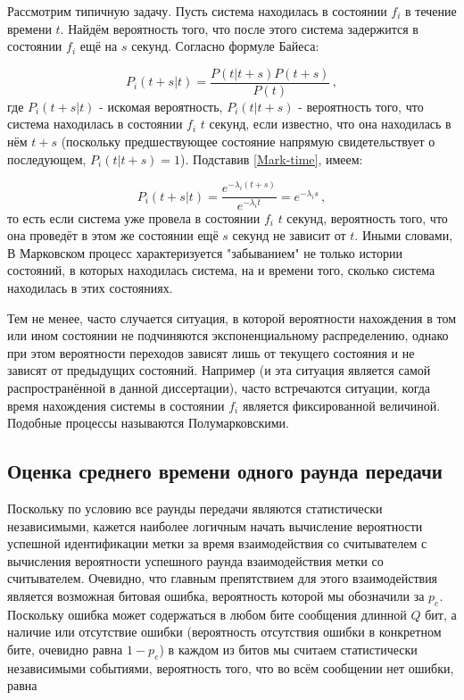 \documentclass[12pt]{article}
\theoremstyle{definition}
\begin{document}
Рассмотрим типичную задачу. Пусть система находилась в состоянии $f_i$ в течение времени $t$. Найдём вероятность того, что после этого система задержится в состоянии $f_i$ ещё на $s$ секунд. Согласно формуле Байеса:

\begin{equation}
    P_i(t+s|t) = \frac{P(t|t+s)P(t+s)}{P(t)}\,,
\end{equation}
где $P_i(t+s|t)$ - искомая вероятность, $P_i(t|t+s)$ - вероятность того, что система находилась в состоянии $f_i$ $t$ секунд, если известно, что она находилась в нём $t+s$ (поскольку предшествующее состояние напрямую свидетельствует о последующем, $P_i(t|t+s) = 1$). Подставив \eqref{Mark-time}, имеем:

\begin{equation}
    P_i(t+s|t) = \frac{e^{-\lambda_i(t+s)}}{e^{-\lambda_it}} = e^{-\lambda_is}\,,
\end{equation}
то есть если система уже провела в состоянии $f_i$ $t$ секунд, вероятность того, что она проведёт в этом же состоянии ещё $s$ секунд не зависит от $t$. Иными словами, В Марковском процесс характеризуется "забыванием" не только истории состояний, в которых находилась система, на и времени того, сколько система находилась в этих состояниях.

Тем не менее, часто случается ситуация, в которой вероятности нахождения в том или ином состоянии не подчиняются экспоненциальному распределению, однако при этом вероятности переходов зависят лишь от текущего состояния и не зависят от предыдущих состояний. Например (и эта ситуация является самой распространённой в данной диссертации), часто встречаются ситуации, когда время нахождения системы в состоянии $f_i$ является фиксированной величиной. Подобные процессы называются Полумарковскими.

\subsection{Оценка среднего времени одного раунда передачи}
\label{sec:ch22}
Поскольку по условию все раунды передачи являются статистически независимыми, кажется наиболее логичным начать вычисление вероятности успешной идентификации метки за время взаимодействия со считывателем с вычисления вероятности успешного раунда взаимодействия метки со считывателем. Очевидно, что главным препятствием для этого взаимодействия является возможная битовая ошибка, вероятность которой мы обозначили за $p_e$. Поскольку ошибка может содержаться в любом бите сообщения длинной $Q$ бит, а наличие или отсутствие ошибки (вероятность отсутствия ошибки в конкретном бите, очевидно равна $1-p_e$) в каждом из битов мы считаем статистически независимыми событиями, вероятность того, что во всём сообщении нет ошибки, равна
\end{document}
